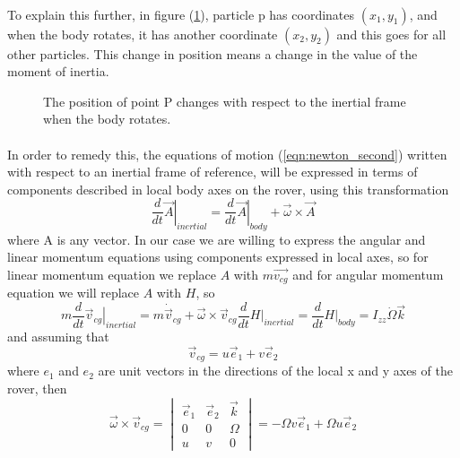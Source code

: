 \documentclass{article}
\begin{document}
	\paragraph{}To explain this further, in figure (\ref{fig:rotate}), particle p has coordinates $(x_1,y_1)$, and when the body rotates, it has another coordinate $(x_2,y_2)$ and this goes for all other particles. This change in position means a change in the value of the moment of inertia. 
	\begin{figure}[H]
		\centering
		\def\svgwidth{200pt}
		
		\caption{The position of point P changes with respect to the inertial frame when the body rotates.}
		\label{fig:rotate}
	\end{figure}
	\paragraph{}In order to remedy this, the equations of motion (\ref{eqn:newton_second}) written with respect to an inertial frame of reference, will be expressed in terms of components described in local body axes on the rover, using this transformation
	\begin{equation}
		\frac{d}{dt}\left.\vec{A}\right|_{inertial} = \frac{d}{dt}\left.\vec{A}\right|_{body} +\vec{\omega}\times\vec{A}
	\end{equation}
	where A is any vector. In our case we are willing to express the angular and linear momentum equations using components expressed in local axes, so for linear momentum equation we replace $A$ with $m\vec{v_{cg}}$ and for angular momentum equation we will replace $A$ with $H$, so
	\begin{subequations}
		\begin{equation}
		m\frac{d}{dt}\left.\vec{v}_{cg}\right|_{inertial} = m\dot{\vec{v}}_{cg} + \vec{\omega}\times\vec{v}_{cg}	
		\end{equation}
		\begin{equation}
		\frac{d}{dt}\left.H\right|_{inertial} = \frac{d}{dt}\left.H\right|_{body} = I_{zz}\dot{\Omega}\vec{k}
		\end{equation}
	\end{subequations}
	and assuming that 
	\[\vec{v}_{cg} = u\vec{e}_1+v\vec{e}_2
	\]
	where $e_1$ and $e_2$ are unit vectors in the directions of the local x and y axes of the rover, then 
	\[\vec{\omega}\times\vec{v}_{cg} = \begin{vmatrix}
	\vec{e}_1 &\vec{e}_2&\vec{k}\\0& 0& \Omega\\u& v& 0
	\end{vmatrix} = -\Omega v\vec{e}_1 +\Omega u\vec{e}_2
	\]
\end{document}
